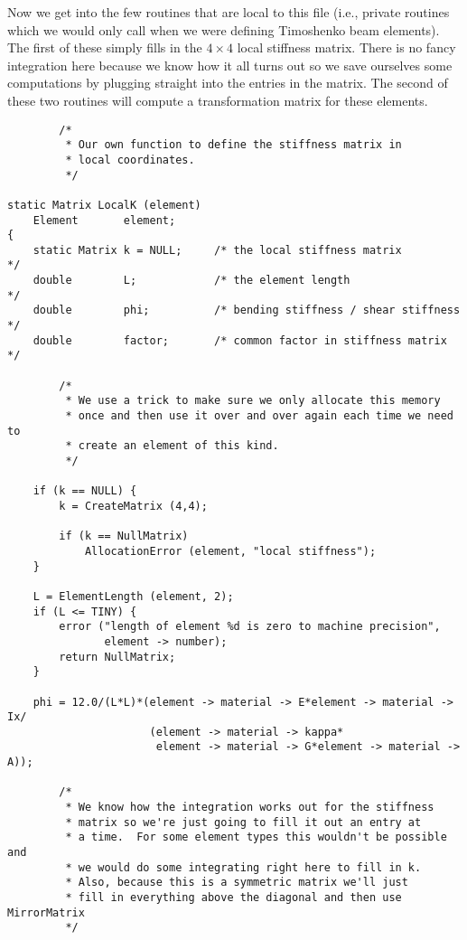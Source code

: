 Now we get into the few routines that are local to this file (i.e., private
routines which we would only call when we were defining Timoshenko beam
elements).  The first of these simply fills in the $4 \times 4$ local stiffness
matrix.  There is no fancy integration here because we know how it
all turns out so we save ourselves some computations by plugging straight
into the entries in the matrix.  The second of these two routines will
compute a transformation matrix for these elements.

{\small
\begin{screen}
 \begin{verbatim}
        /* 
         * Our own function to define the stiffness matrix in
         * local coordinates.
         */

static Matrix LocalK (element)
    Element       element;
{
    static Matrix k = NULL;     /* the local stiffness matrix          */
    double        L;            /* the element length                  */
    double        phi;          /* bending stiffness / shear stiffness */
    double        factor;       /* common factor in stiffness matrix   */

        /*
         * We use a trick to make sure we only allocate this memory
         * once and then use it over and over again each time we need to
         * create an element of this kind.
         */

    if (k == NULL) {
        k = CreateMatrix (4,4);

        if (k == NullMatrix)
            AllocationError (element, "local stiffness");
    }

    L = ElementLength (element, 2);
    if (L <= TINY) {
        error ("length of element %d is zero to machine precision",
               element -> number);
        return NullMatrix;
    }   

    phi = 12.0/(L*L)*(element -> material -> E*element -> material -> Ix/
                      (element -> material -> kappa*
                       element -> material -> G*element -> material -> A));

        /*
         * We know how the integration works out for the stiffness
         * matrix so we're just going to fill it out an entry at
         * a time.  For some element types this wouldn't be possible and
         * we would do some integrating right here to fill in k.
         * Also, because this is a symmetric matrix we'll just
         * fill in everything above the diagonal and then use MirrorMatrix
         */


\end{verbatim}
\end{screen}}
